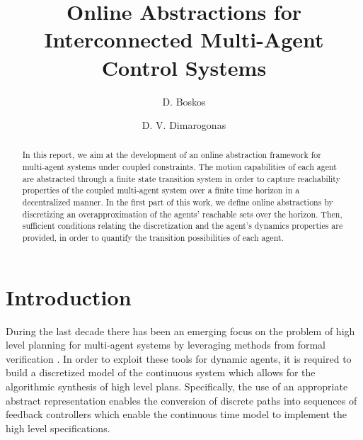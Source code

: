 \documentclass[reqno]{amsart}
\theoremstyle{plain}
\theoremstyle{definition}
\numberwithin{equation}{section}
\begin{document}
\author{D. Boskos}
\address{Department of Automatic Control, School of Electrical Engineering, KTH Royal Institute of Technology, Osquldas v\"ag 10, 10044, Stockholm, Sweden}

\author{D. V. Dimarogonas}
\address{Department of Automatic Control, School of Electrical Engineering, KTH Royal Institute of Technology, Osquldas v\"ag 10, 10044, Stockholm, Sweden}

\begin{abstract}
In this report, we aim at the development of an online abstraction framework for multi-agent systems under coupled constraints. The motion capabilities of each agent are abstracted through a finite state transition system in order to capture reachability properties of the coupled multi-agent system over a finite time horizon in a decentralized manner. In the first part of this work, we define online abstractions by discretizing an overapproximation of the agents' reachable sets over the horizon. Then, sufficient conditions relating the discretization and the agent's dynamics properties are provided, in order to quantify the transition possibilities of each agent.  
\end{abstract}


\title{Online Abstractions for Interconnected Multi-Agent Control Systems}

\maketitle

\section{Introduction}

During the last decade there has been an emerging focus on the problem of high level planning for  multi-agent systems by leveraging methods from formal verification \cite{LsKk04}. In order to  
exploit these tools for dynamic agents, it is required to build a discretized model of the continuous system which allows for the algorithmic synthesis of high level plans. Specifically, the use of an appropriate abstract representation enables the conversion of discrete paths into sequences of feedback controllers which enable the continuous time model to implement the high level specifications.    
\end{document}
